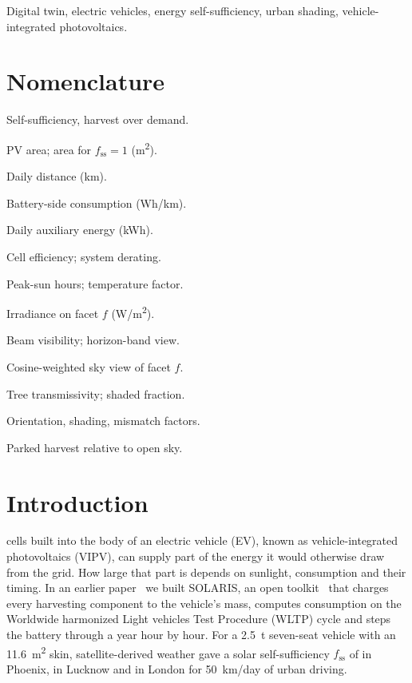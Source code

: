 \documentclass[lettersize,journal]{IEEEtran}
\newcommand{\fss}{f_{\mathrm{ss}}}
\newcommand{\Fgeo}{F_{\mathrm{geo}}}
\newcommand{\Fsh}{F_{\mathrm{sh}}}
\newcommand{\Fmm}{F_{\mathrm{mm}}}
\newcommand{\Fpark}{F_{\mathrm{park}}}
\begin{document}
\begin{IEEEkeywords}
Digital twin, electric vehicles, energy self-sufficiency, urban shading, vehicle-integrated photovoltaics.
\end{IEEEkeywords}

\section*{Nomenclature}
\begin{IEEEdescription}[\IEEEusemathlabelsep\IEEEsetlabelwidth{$\Fgeo,\Fsh,\Fmm$}]
\item[$\fss$] Self-sufficiency, harvest over demand.
\item[$A$, $A_{\mathrm{req}}$] PV area; area for $\fss=1$ (\si{m^2}).
\item[$D$] Daily distance (km).
\item[$c$] Battery-side consumption (Wh/km).
\item[$E_{\mathrm{aux}}$] Daily auxiliary energy (kWh).
\item[$\eta_{\mathrm{pv}}$, $\kappa_{\mathrm{pv}}$] Cell efficiency; system derating.
\item[PSH, $f_T$] Peak-sun hours; temperature factor.
\item[$G_f$] Irradiance on facet $f$ (\si{W/m^2}).
\item[$\bar v_{b,f}$, $\bar v_{h,f}$] Beam visibility; horizon-band view.
\item[$\mathrm{SVF}_f$] Cosine-weighted sky view of facet $f$.
\item[$\tau$, $s$] Tree transmissivity; shaded fraction.
\item[$\Fgeo,\Fsh,\Fmm$] Orientation, shading, mismatch factors.
\item[$\Fpark$] Parked harvest relative to open sky.
\end{IEEEdescription}

\section{Introduction}
 cells built into the body of an electric vehicle (EV), known as vehicle-integrated photovoltaics (VIPV), can supply part of the energy it would otherwise draw from the grid. How large that part is depends on sunlight, consumption and their timing. In an earlier paper~\cite{ref_conf} we built SOLARIS, an open toolkit~\cite{ref_code} that charges every harvesting component to the vehicle's mass, computes consumption on the Worldwide harmonized Light vehicles Test Procedure (WLTP) cycle and steps the battery through a year hour by hour. For a \SI{2.5}{t} seven-seat vehicle with an \SI{11.6}{m^2} skin, satellite-derived weather gave a solar self-sufficiency $\fss$ of \BzPhxIIfssTwo{} in Phoenix, \BzLkoIIfssTwo{} in Lucknow and \BzLonIIfssTwo{} in London for \SI{50}{km/day} of urban driving.
\end{document}
